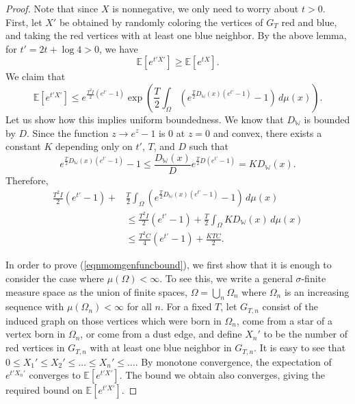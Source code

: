 \documentclass{amsart}
\numberwithin{equation}{section}
\numberwithin{figure}{section}
\theoremstyle{definition}
\theoremstyle{remark}
\newcommand{\EE}{\mathbb{E}}
\newcommand{\cW}{\mathbb{W}}
\begin{document}
\begin{proof}
Note that since $X$ is nonnegative, we only need to worry about $t>0$. First,
let $X'$ be obtained by randomly coloring the vertices of $G_{T}$ red and
blue, and taking the red vertices with at least one blue neighbor. By the
above lemma, for $t'=2t+\log 4>0$, we have
\[\EE[e^{t'X'}] \ge \EE[e^{tX}].
\]
We claim that
\begin{equation} \label{eqnmomgenfuncbound}
\EE[e^{t'X'}] \le e^{\frac{T^2I}2 (e^{t'}-1)}
\exp\left( \frac T2\int_\Omega \left(e^{\frac T2 D_\cW(x)(e^{t'}-1)}-1\right) \,d\mu(x) \right).
\end{equation}
Let us show how this implies uniform boundedness. We know that $D_\cW$ is
bounded by $D$. Since the function $z \rightarrow e^z-1$ is $0$ at $z=0$ and
convex, there exists a constant $K$ depending only on $t'$, $T$, and $D$ such
that
\[e^{\frac T2D_\cW(x)(e^{t'}-1)}-1 \leq \frac{D_\cW(x)}{D}e^{\frac T2D(e^{t'}-1)}
= KD_\cW(x).
\]
Therefore,
\begin{align*}
\frac{T^2I}2 (e^{t'}-1)+&\frac T2\int_\Omega \left(e^{\frac T2 D_\cW(x)(e^{t'}-1)}-1\right) \,d\mu(x)\\
&\le\frac{T^2I}2 (e^{t'}-1)+\frac T2 \int_\Omega KD_\cW(x) \,d\mu(x)\\
& \le \frac{T^2C}4 (e^{t'}-1)+\frac{KTC}2
.
\end{align*}

In order to prove (\ref{eqnmomgenfuncbound}), we first show that it is enough
to consider the case where $\mu(\Omega)<\infty$. To see this, we write a
general $\sigma$-finite measure space as the union of finite spaces,
$\Omega=\bigcup_n\Omega_n$ where $\Omega_n$ is an increasing sequence with
$\mu(\Omega_n)<\infty$ for all $n$. For a fixed $T$, let $G_{T,n}$ consist of
the induced graph on those vertices which were born in $\Omega_n$, come from
a star of a vertex born in $\Omega_n$, or come from a dust edge, and define
$X_n'$ to be the number of red vertices in $G_{T,n}$ with at least one blue
neighbor in $G_{T,n}$. It is easy to see that $0 \le X_1' \le X_2' \le \dots
\le X_n' \le \dots$. By monotone convergence, the expectation of $e^{t'X_n'}$
converges to $\EE[e^{t'X'}]$. The bound we obtain also converges, giving the
required bound on $\EE[e^{t'X'}]$.


\end{proof}
\end{document}
